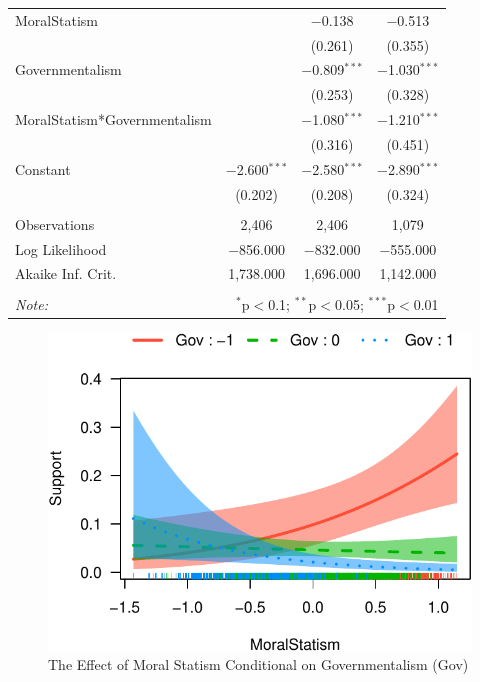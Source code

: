 \documentclass[12pt,]{article}
\begin{document}
\begin{table}[!htbp]
\begin{tabular}{@{\extracolsep{5pt}}lccc}
  MoralStatism &  & $-$0.138 & $-$0.513 \\ 
  &  & (0.261) & (0.355) \\ 
  Governmentalism &  & $-$0.809$^{***}$ & $-$1.030$^{***}$ \\ 
  &  & (0.253) & (0.328) \\ 
  MoralStatism*Governmentalism &  & $-$1.080$^{***}$ & $-$1.210$^{***}$ \\ 
  &  & (0.316) & (0.451) \\ 
  Constant & $-$2.600$^{***}$ & $-$2.580$^{***}$ & $-$2.890$^{***}$ \\ 
  & (0.202) & (0.208) & (0.324) \\ 
 \hline \\[-1.8ex] 
Observations & 2,406 & 2,406 & 1,079 \\ 
Log Likelihood & $-$856.000 & $-$832.000 & $-$555.000 \\ 
Akaike Inf. Crit. & 1,738.000 & 1,696.000 & 1,142.000 \\ 
\hline 
\hline \\[-1.8ex] 
\textit{Note:}  & \multicolumn{3}{r}{$^{*}$p$<$0.1; $^{**}$p$<$0.05; $^{***}$p$<$0.01} \\ 
\end{tabular} 
\end{table}

\pagebreak

\doublespacing

\begin{figure}[htbp]
\centering
\includegraphics{figures/effect-plot1-1.pdf}
\caption{The Effect of Moral Statism Conditional on Governmentalism
(Gov)}
\end{figure}
\end{document}
